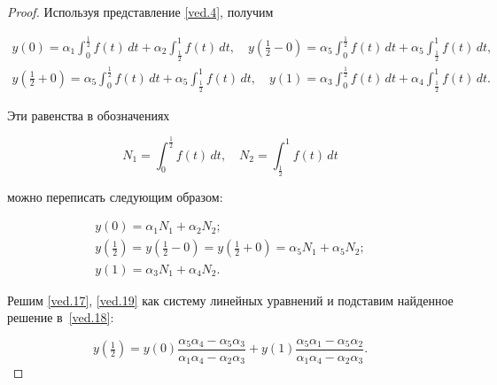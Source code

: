 \begin{proof}
Используя представление \eqref{ved.4}, получим   

\begin{gather}   

y(0)=\alpha_1 \int _{0}^{\frac12} f(t)\,dt + \alpha_2 \int _{\frac12}^{1} f(t)\,dt,

\quad 

y(\tfrac12-0)=\alpha_5\int _{0}^{\frac12} {f(t)\,dt}+ \alpha_5\int _{\frac12}^{1}{f(t)\,dt},

\\

y(\tfrac12+0)=\alpha_5\int _{0}^{\frac12} {f(t)\,dt}+ \alpha_5\int _{\frac12}^{1}{f(t)\,dt},

\quad

y(1)=\alpha_3\int _{0}^{\frac12} {f(t)\,dt}+ \alpha_4\int _{\frac12}^{1}{f(t)\,dt}.

\end{gather}



Эти равенства в обозначениях   

$$N_1=\int _{0}^{\frac12} f(t)\,dt,\quad N_2=\int _{\frac12}^{1}{f(t)\,dt}

$$

можно переписать следующим образом:   

\begin{gather}

\label{ved.17}

y(0)=\alpha_1 N_1+\alpha_2 N_2;

\\

\label{ved.18}

y(\tfrac12)=y(\tfrac12-0)=y(\tfrac12+0)=\alpha_5 N_1+\alpha_5 N_2;

\\

\label{ved.19}

y(1)=\alpha_3 N_1+\alpha_4 N_2.

\end{gather} 

Решим \eqref{ved.17}, \eqref{ved.19}  как систему линейных уравнений и подставим найденное решение в~\eqref{ved.18}:

$$

y(\tfrac12)=y(0)\frac{\alpha_5\alpha_4-\alpha_5\alpha_3}{\alpha_1\alpha_4-\alpha_2\alpha_3}+

y(1)\frac{\alpha_5\alpha_1-\alpha_5\alpha_2}{\alpha_1\alpha_4-\alpha_2\alpha_3}.

$$


\end{proof}
